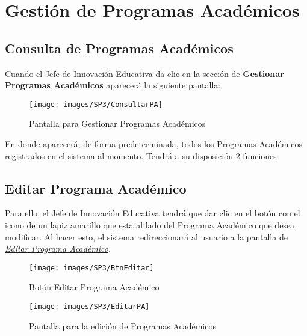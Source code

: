 
\chapter{Gestión de Programas Académicos}
    \section{Consulta de Programas Académicos}
        Cuando el Jefe de Innovación Educativa da clic en la sección de \textbf{Gestionar Programas Académicos} aparecerá la siguiente pantalla:


        \begin{figure}[!hbtp]
        	\centering
        	\hypertarget{consultarpa}{\texttt{[image: images/SP3/ConsultarPA]}}
        	\caption{Pantalla para Gestionar Programas Académicos}
        	\label{consultarpa}
        \end{figure}

        En donde aparecerá, de forma predeterminada, todos los Programas Académicos  registrados en el sistema al momento. Tendrá a su disposición 2 funciones:

	    \section{Editar Programa Académico}

        	Para ello, el Jefe de Innovación Educativa tendrá que dar clic en el botón con el icono de un lapiz amarillo que esta al lado del Programa Académico que desea modificar. Al hacer esto, el sistema redireccionará al usuario a la pantalla de \hyperlink{editarpa}{\textit{Editar Programa Académico}}.

        	\begin{figure}[!hbtp]
        		\centering
        		\hypertarget{editar}{\texttt{[image: images/SP3/BtnEditar]}}
        		\caption{Botón Editar Programa Académico}
        		\label{editar}
        	\end{figure}

        \begin{figure}[!hbtp]
        	\centering
        	\hypertarget{editarpa}{\texttt{[image: images/SP3/EditarPA]}}
        	\caption{Pantalla para la edición de Programas Académicos}
        	\label{editarpa}
        \end{figure}

